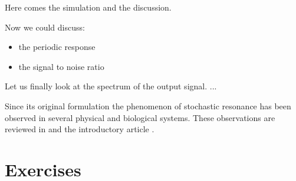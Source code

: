 Here comes the simulation and the discussion.


Now we could discuss:
\begin{itemize}
\item the periodic response
\item the signal to noise ratio
\end{itemize}

Let us finally look at the spectrum of the output signal. ...



Since its original formulation the phenomenon of stochastic resonance has been
observed in several physical and biological systems. These observations are
reviewed in 
\cite{Gammaitoni} and the introductory article \cite{Bulsara} .



\section{Exercises}

